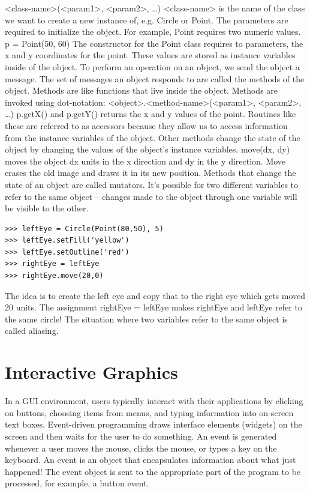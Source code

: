 \documentclass[12pt,a4paper,final,twoside,titlepage]{book}
\begin{document}
<class-name>(<param1>, <param2>, …)
<class-name> is the name of the class we want to create a new instance of, e.g. Circle or Point.
The parameters are required to initialize the object. For example, Point requires two numeric values.
p = Point(50, 60)
The constructor for the Point class requires to parameters, the x and y coordinates for the point.
These values are stored as instance variables inside of the object.
To perform an operation on an object, we send the object a message. The set of messages an object responds to are called the methods of the object. Methods are like functions that live inside the object.
Methods are invoked using dot-notation:
<object>.<method-name>(<param1>, <param2>, …)
p.getX() and p.getY() returns the x and y values of the point. Routines like these are referred to as accessors because they allow us to access information from the instance variables of the object.
Other methods change the state of the object by changing the values of the object’s instance variables.
move(dx, dy) moves the object dx units in the x direction and dy in the y direction.
Move erases the old image and draws it in its new position. Methods that change the state of an object are called mutators.
It’s possible for two different variables to refer to the same object – changes made to the object through one variable will be visible to the other.
\begin{lstlisting}
>>> leftEye = Circle(Point(80,50), 5)
>>> leftEye.setFill('yellow')
>>> leftEye.setOutline('red')
>>> rightEye = leftEye
>>> rightEye.move(20,0)
\end{lstlisting}
The idea is to create the left eye and copy that to the right eye which gets moved 20 units. The assignment rightEye = leftEye makes rightEye and leftEye refer to the same circle! The situation where two variables refer to the same object is called aliasing.

\section {Interactive Graphics}
In a GUI environment, users typically interact with their applications by clicking on buttons, choosing items from menus, and typing information into on-screen text boxes.
Event-driven programming draws interface elements (widgets) on the screen and then waits for the user to do something. An event is generated whenever a user moves the mouse, clicks the mouse, or types a key on the keyboard.
An event is an object that encapsulates information about what just happened! The event object is sent to the appropriate part of the program to be processed, for example, a button event.
\end{document}
